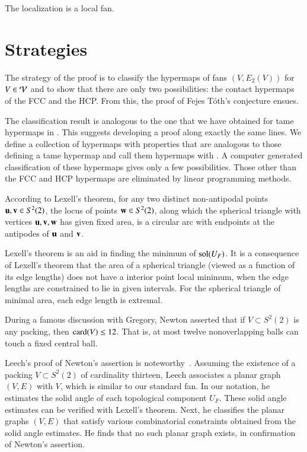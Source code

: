 \documentclass{llncs}
\begin{document}
The localization is a local fan.

\section{Strategies}

The strategy of the proof is to classify the hypermaps of 
fans $(V,E_2(V))$ for $V\in {\mathcal V}$ and to show that there are only two
possibilities: the contact hypermaps of the FCC and the HCP.  From
this, the proof of Fejes T\'oth's conjecture ensues.

The classification result is analogous to the one that we have 
obtained for tame hypermaps in \cite{DSP}.  
This suggests developing a proof along
exactly the same lines.  We define a 
collection of hypermaps with properties that are analogous to those
defining a tame hypermap and call them hypermaps with 
.  A computer generated classification of these hypermaps
gives only a few possibilities.  Those other than the FCC and
HCP hypermaps are eliminated by linear programming methods.


\begin{remark}
According to Lexell's theorem, for any two distinct non-antipodal points ${\mathbf u},{\mathbf v}\in S^2(2)$,
the locus of points ${\mathbf w}\in S^2(2)$, along which
the spherical triangle with vertices ${\mathbf u},{\mathbf v},{\mathbf w}$ has given fixed area, is a circular arc
with endpoints at the antipodes of ${\mathbf u}$ and ${\mathbf v}$.

Lexell's theorem is an aid in finding the minimum of
  $\operatorname{sol}(U_F)$.
  It is a consequence of Lexell's theorem that the area of a spherical
  triangle (viewed as a function of its edge lengths) does not have a
  interior point local minimum, when the edge lengths are
  constrained to lie in given intervals.  For the spherical triangle of minimal area,
each  edge length is extremal.
%
%
\end{remark}

\begin{remark}
During a famous discussion with Gregory, Newton asserted that 
if $V\subset S^2(2)$ is any packing, then ${\hbox{card}}(V)\le 12$. That is, at most
twelve nonoverlapping balls can touch a fixed central ball.  
%
%
%
%
  
 Leech's proof of Newton's assertion is
noteworthy~\cite{Leech:1956:MG}.  Assuming the existence of a packing
$V\subset S^2(2)$ of cardinality thirteen, Leech associates a planar graph
$(V,E)$ with $V$, which is similar to our standard fan.  In
our notation, he estimates the solid angle of each topological
component $U_F$.  These solid angle estimates can be verified with Lexell's theorem.
Next, he classifies the planar graphs $(V,E)$ that satisfy various
combinatorial constraints obtained from the solid angle estimates. He
finds that no such planar graph exists, in confirmation of Newton's
assertion.
\end{remark}
\end{document}
